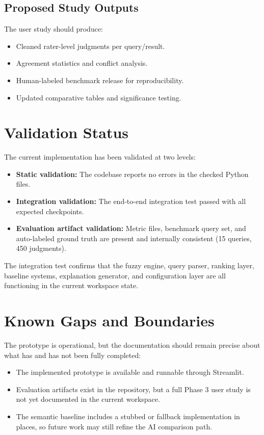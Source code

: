\documentclass[11pt,a4paper]{article}
\begin{document}
\subsection{Proposed Study Outputs}

The user study should produce:
\begin{itemize}[leftmargin=1.5em]
  \item Cleaned rater-level judgments per query/result.
  \item Agreement statistics and conflict analysis.
  \item Human-labeled benchmark release for reproducibility.
  \item Updated comparative tables and significance testing.
\end{itemize}

\section{Validation Status}

The current implementation has been validated at two levels:

\begin{itemize}[leftmargin=1.5em]
  \item \textbf{Static validation:} The codebase reports no errors in the checked Python files.
  \item \textbf{Integration validation:} The end-to-end integration test passed with all expected checkpoints.
  \item \textbf{Evaluation artifact validation:} Metric files, benchmark query set, and auto-labeled ground truth are present and internally consistent (15 queries, 450 judgments).
\end{itemize}

The integration test confirms that the fuzzy engine, query parser, ranking layer, baseline systems, explanation generator, and configuration layer are all functioning in the current workspace state.

\section{Known Gaps and Boundaries}

The prototype is operational, but the documentation should remain precise about what has and has not been fully completed:

\begin{itemize}[leftmargin=1.5em]
  \item The implemented prototype is available and runnable through Streamlit.
  \item Evaluation artifacts exist in the repository, but a full Phase 3 user study is not yet documented in the current workspace.
  \item The semantic baseline includes a stubbed or fallback implementation in places, so future work may still refine the AI comparison path.
\end{itemize}
\end{document}
